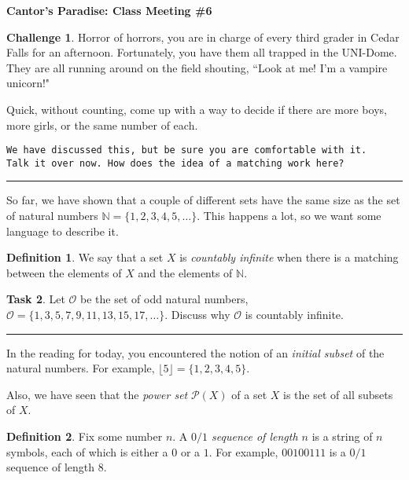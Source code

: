 \documentclass[12pt]{amsart}
\theoremstyle{definition}
\newtheorem{task}{Task}
\newtheorem{challenge}[task]{Challenge}
\newtheorem*{definition}{Definition}
\begin{document}
\begin{center}
\textbf{\Huge
Cantor's Paradise: Class Meeting \#6
}
\end{center}


\vspace{.5in}

\begin{challenge}
Horror of horrors, you are in charge of every third grader in Cedar Falls for an afternoon.
Fortunately, you have them all trapped in the UNI-Dome.
They are all running around on the field shouting, ``Look at me! I'm a vampire unicorn!"

Quick, without counting, come up with a way to decide if there are more boys, more girls, or the same number of each.
\end{challenge}

\texttt{We have discussed this, but be sure you are comfortable with it. \\
Talk it over now. How does the idea of a matching work here?}

\vspace{.1in}
\hrule
\vspace{.1in}

So far, we have shown that a couple of different sets have the same size as the set of natural numbers $\mathbb{N} = \{1, 2, 3, 4, 5, \dots\}$.
This happens a lot, so we want some language to describe it.

\begin{definition}
We say that a set $X$ is \emph{countably infinite} when there is a matching between the elements of $X$ and the elements of $\mathbb{N}$.
\end{definition}

\begin{task} Let $\mathcal{O}$ be the set of odd natural numbers,
$\mathcal{O} = \{ 1, 3, 5, 7, 9, 11, 13, 15, 17, \dots\}$.
Discuss why $\mathcal{O}$ is countably infinite.
\end{task}

\vspace{.1in}
\hrule
\vspace{.1in}

In the reading for today, you encountered the notion of an \emph{initial subset} of the natural numbers.
For example, $\lfloor 5 \rfloor = \{1, 2, 3, 4, 5\}$.

Also, we have seen that the \emph{power set} $\mathcal{P}(X)$ of a set $X$ is the set of all subsets of $X$.

\begin{definition}
Fix some number $n$. A \emph{$0/1$ sequence of length $n$} is a string of $n$ symbols, each of which is either a $0$ or a $1$.
For example, $00100111$ is a $0/1$ sequence of length $8$.
\end{definition}
\end{document}
